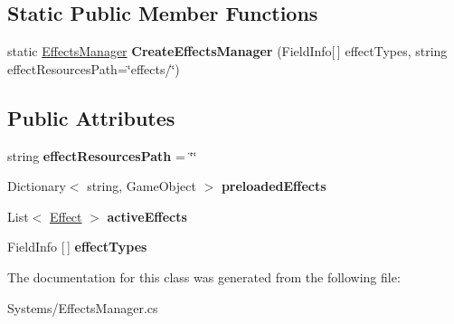 \subsection*{Static Public Member Functions}
\begin{DoxyCompactItemize}
\item 
\mbox{\label{class_stompy_blondie_1_1_systems_1_1_effects_manager_a9c38a685a51d9dafe2b0734a457d6801}} 
static \mbox{\hyperlink{class_stompy_blondie_1_1_systems_1_1_effects_manager}{Effects\+Manager}} {\bfseries Create\+Effects\+Manager} (Field\+Info\mbox{[}$\,$\mbox{]} effect\+Types, string effect\+Resources\+Path=\char`\"{}effects/\char`\"{})
\end{DoxyCompactItemize}
\subsection*{Public Attributes}
\begin{DoxyCompactItemize}
\item 
\mbox{\label{class_stompy_blondie_1_1_systems_1_1_effects_manager_a9e917930d6e328a83cb87639ac1b3599}} 
string {\bfseries effect\+Resources\+Path} = \char`\"{}\char`\"{}
\item 
\mbox{\label{class_stompy_blondie_1_1_systems_1_1_effects_manager_abde357ddd92a368b4eebc347b5bc3c66}} 
Dictionary$<$ string, Game\+Object $>$ {\bfseries preloaded\+Effects}
\item 
\mbox{\label{class_stompy_blondie_1_1_systems_1_1_effects_manager_ae66380ec6b74d10b8e3cb2ee8e5fca1e}} 
List$<$ \mbox{\hyperlink{class_stompy_blondie_1_1_systems_1_1_effect}{Effect}} $>$ {\bfseries active\+Effects}
\item 
\mbox{\label{class_stompy_blondie_1_1_systems_1_1_effects_manager_a185cf6e4134d962c94b3ea7e39355339}} 
Field\+Info \mbox{[}$\,$\mbox{]} {\bfseries effect\+Types}
\end{DoxyCompactItemize}


The documentation for this class was generated from the following file\+:\begin{DoxyCompactItemize}
\item 
Systems/Effects\+Manager.\+cs\end{DoxyCompactItemize}
